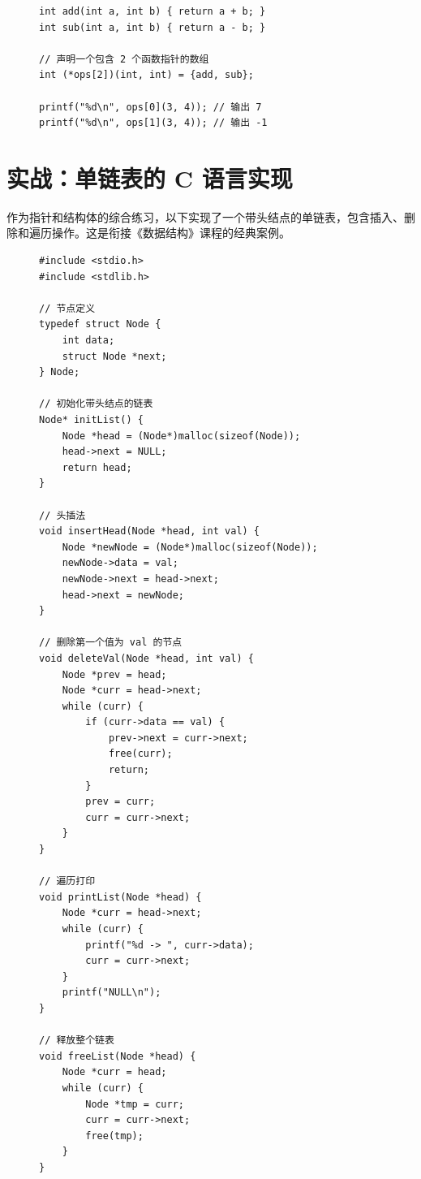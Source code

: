 \begin{figure}[H]
\centering
\begin{minipage}{0.95\textwidth}
\begin{lstlisting}[caption={函数指针数组示例}]
int add(int a, int b) { return a + b; }
int sub(int a, int b) { return a - b; }

// 声明一个包含 2 个函数指针的数组
int (*ops[2])(int, int) = {add, sub};

printf("%d\n", ops[0](3, 4)); // 输出 7
printf("%d\n", ops[1](3, 4)); // 输出 -1
\end{lstlisting}
\end{minipage}
\end{figure}

\section{实战：单链表的 C 语言实现}

作为指针和结构体的综合练习，以下实现了一个带头结点的单链表，包含插入、删除和遍历操作。这是衔接《数据结构》课程的经典案例。

\begin{figure}[H]
\centering
\begin{minipage}{0.95\textwidth}
\begin{lstlisting}[caption={单链表完整实现}]
#include <stdio.h>
#include <stdlib.h>

// 节点定义
typedef struct Node {
    int data;
    struct Node *next;
} Node;

// 初始化带头结点的链表
Node* initList() {
    Node *head = (Node*)malloc(sizeof(Node));
    head->next = NULL;
    return head;
}

// 头插法
void insertHead(Node *head, int val) {
    Node *newNode = (Node*)malloc(sizeof(Node));
    newNode->data = val;
    newNode->next = head->next;
    head->next = newNode;
}

// 删除第一个值为 val 的节点
void deleteVal(Node *head, int val) {
    Node *prev = head;
    Node *curr = head->next;
    while (curr) {
        if (curr->data == val) {
            prev->next = curr->next;
            free(curr);
            return;
        }
        prev = curr;
        curr = curr->next;
    }
}

// 遍历打印
void printList(Node *head) {
    Node *curr = head->next;
    while (curr) {
        printf("%d -> ", curr->data);
        curr = curr->next;
    }
    printf("NULL\n");
}

// 释放整个链表
void freeList(Node *head) {
    Node *curr = head;
    while (curr) {
        Node *tmp = curr;
        curr = curr->next;
        free(tmp);
    }
}
\end{lstlisting}
\end{minipage}
\end{figure}
